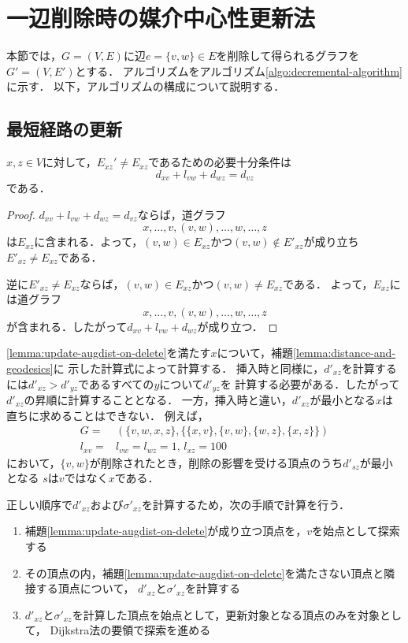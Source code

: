 \section{一辺削除時の媒介中心性更新法}
\label{sect:update-bc-on-delete}
本節では，$G=(V,E)$に辺$e=\{v,w\}\in E$を削除して得られるグラフを$G'=(V,E')$とする．
アルゴリズムをアルゴリズム\ref{algo:decremental-algorithm}に示す．
以下，アルゴリズムの構成について説明する．

\subsection{最短経路の更新}
\label{subsect:update-augdist-on-delete}

\begin{lemma}
  \label{lemma:update-augdist-on-delete}
  $x,z\in V$に対して，$E_{xz}'\neq E_{xz}$であるための必要十分条件は
  \[ d_{xv}+l_{vw}+d_{wz}=d_{vz} \]
  である．
\end{lemma}
\begin{proof}
  $d_{xv}+l_{vw}+d_{wz}=d_{vz}$ならば，道グラフ
  \[ x,\ldots,v,(v,w),\ldots,w,\ldots,z \]
  は$E_{xz}$に含まれる．よって，$(v,w)\in E_{xz}$かつ$(v,w)\notin E'_{xz}$が成り立ち
  $E'_{xz}\neq E_{xz}$である．

  逆に$E'_{xz}\neq E_{xz}$ならば，$(v,w)\in E_{xz}$かつ$(v,w)\neq E_{xz}$である．
  よって，$E_{xz}$には道グラフ
  \[ x,\ldots,v,(v,w),\ldots,w,\ldots,z \]
  が含まれる．したがって$d_{xv}+l_{vw}+d_{wz}$が成り立つ．
\end{proof}

\ref{lemma:update-augdist-on-delete}を満たす$x$について，補題\ref{lemma:distance-and-geodesics}に
示した計算式によって計算する．
挿入時と同様に，$d'_{xz}$を計算するには$d'_{xz}>d'_{yz}$であるすべての$y$について$d'_{yz}$を
計算する必要がある．したがって$d'_{xz}$の昇順に計算することとなる．
一方，挿入時と違い，$d'_{xz}$が最小となる$x$は直ちに求めることはできない．
例えば，
\begin{equation*}
  \begin{aligned}
    G=&(\{v,w,x,z\},\{\{x,v\},\{v,w\},\{w,z\},\{x,z\}\})\\
    l_{xv}=&l_{vw}=l_{wz}=1,\,l_{xz}=100
  \end{aligned}
\end{equation*}
において，$\{v,w\}$が削除されたとき，削除の影響を受ける頂点のうち$d'_{sz}$が最小となる
$s$は$v$ではなく$x$である．

正しい順序で$d'_{xz}$および$\sigma'_{xz}$を計算するため，次の手順で計算を行う．
\begin{enumerate}
\item 補題\ref{lemma:update-augdist-on-delete}が成り立つ頂点を，$v$を始点として探索する
\item その頂点の内，補題\ref{lemma:update-augdist-on-delete}を満たさない頂点と隣接する頂点について，
  $d'_{xz}$と$\sigma'_{xz}$を計算する
\item $d'_{xz}$と$\sigma'_{xz}$を計算した頂点を始点として，更新対象となる頂点のみを対象として，
  Dijkstra法の要領で探索を進める
\end{enumerate}

